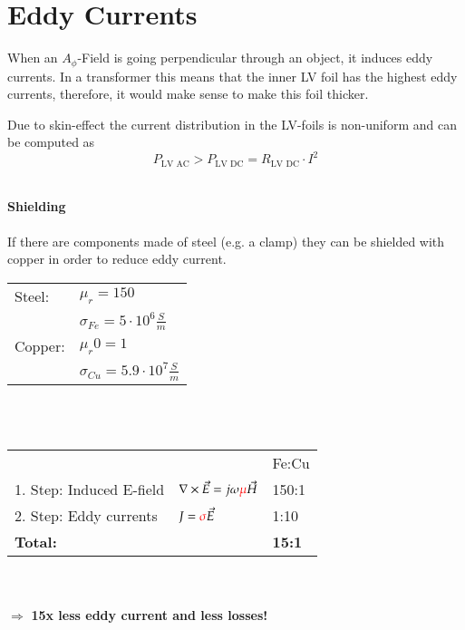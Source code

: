 \section{Eddy Currents}
When an $A_\phi$-Field is going perpendicular through an object, it induces eddy currents. In a transformer this means that the inner LV foil has the highest eddy currents, therefore, it would make sense to make this foil thicker. \newline

Due to skin-effect the current distribution in the LV-foils is non-uniform and can be computed as
\begin{equation*}
	P_\textrm{LV AC} > P_\textrm{LV DC} = R_\textrm{LV DC} \cdot I^2
\end{equation*}

\textbf{\\Shielding \\ \\} 
If there are components made of steel (e.g. a clamp) they can be shielded with copper in order to reduce eddy current. \newline 
\begin{tabular}{ll}
	Steel: 	& \(\displaystyle \mu_r = 150\) \\
			& \(\displaystyle \sigma_{Fe} = 5 \cdot 10^6 \frac{S}{m} \) \\
	Copper: & \(\displaystyle \mu_r 0= 1 \) \\
			& \(\displaystyle \sigma_{Cu} = 5.9 \cdot 10^7 \frac{S}{m} \) \\
\end{tabular} \\ \\
\begin{tabular}{lll}
	 & & Fe:Cu \\
	1. Step: Induced E-field & \(\displaystyle \nabla \times \vec{E} = j\omega\color{red}\mu\color{black}\vec{H} \) & 150:1 \\
	2. Step: Eddy currents  & \(\displaystyle J = \color{red}\sigma\color{black}\vec{E} \) & 1:10 \\
	\textbf{Total:} & & \textbf{15:1}
\end{tabular}\\ \\
$\Rightarrow$ \textbf{15x less eddy current and less losses!}